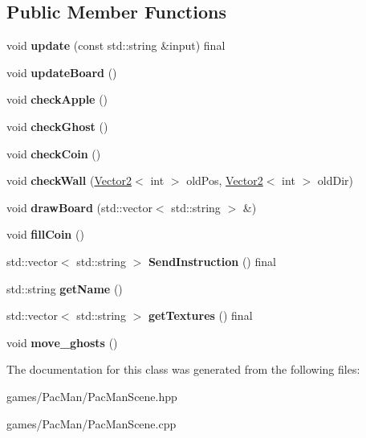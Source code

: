 \subsection*{Public Member Functions}
\begin{DoxyCompactItemize}
\item 
\mbox{\label{class_pac_man_scene_aed1cba4fdcc5de835eaad230b7f91c7a}} 
void {\bfseries update} (const std\+::string \&input) final
\item 
\mbox{\label{class_pac_man_scene_a36aa174f984c0d95f7640d202d8e7147}} 
void {\bfseries update\+Board} ()
\item 
\mbox{\label{class_pac_man_scene_a44afe54e906f4e52399885170c60fd54}} 
void {\bfseries check\+Apple} ()
\item 
\mbox{\label{class_pac_man_scene_a18907fcbd5b997b1c189eeff16ad976a}} 
void {\bfseries check\+Ghost} ()
\item 
\mbox{\label{class_pac_man_scene_a227a7de2f0bb9c20f983d450695a2b51}} 
void {\bfseries check\+Coin} ()
\item 
\mbox{\label{class_pac_man_scene_a822b15e261ac1fd601b7b9807529cbff}} 
void {\bfseries check\+Wall} (\hyperlink{struct_vector2}{Vector2}$<$ int $>$ old\+Pos, \hyperlink{struct_vector2}{Vector2}$<$ int $>$ old\+Dir)
\item 
\mbox{\label{class_pac_man_scene_a3a4ac446de6df34415b202530884469e}} 
void {\bfseries draw\+Board} (std\+::vector$<$ std\+::string $>$ \&)
\item 
\mbox{\label{class_pac_man_scene_a75698a31bbe77a495277c7fa64ca5f94}} 
void {\bfseries fill\+Coin} ()
\item 
\mbox{\label{class_pac_man_scene_a1bab9f4bac4f6369b124b4387eeda097}} 
std\+::vector$<$ std\+::string $>$ {\bfseries Send\+Instruction} () final
\item 
\mbox{\label{class_pac_man_scene_a53d3395cbcdd4192aab8aacf751f79d0}} 
std\+::string {\bfseries get\+Name} ()
\item 
\mbox{\label{class_pac_man_scene_a343de23273852ce28dbac16bac963ebc}} 
std\+::vector$<$ std\+::string $>$ {\bfseries get\+Textures} () final
\item 
\mbox{\label{class_pac_man_scene_a68f11fa508813abe9872a3b618287d2d}} 
void {\bfseries move\+\_\+ghosts} ()
\end{DoxyCompactItemize}


The documentation for this class was generated from the following files\+:\begin{DoxyCompactItemize}
\item 
games/\+Pac\+Man/Pac\+Man\+Scene.\+hpp\item 
games/\+Pac\+Man/Pac\+Man\+Scene.\+cpp\end{DoxyCompactItemize}
